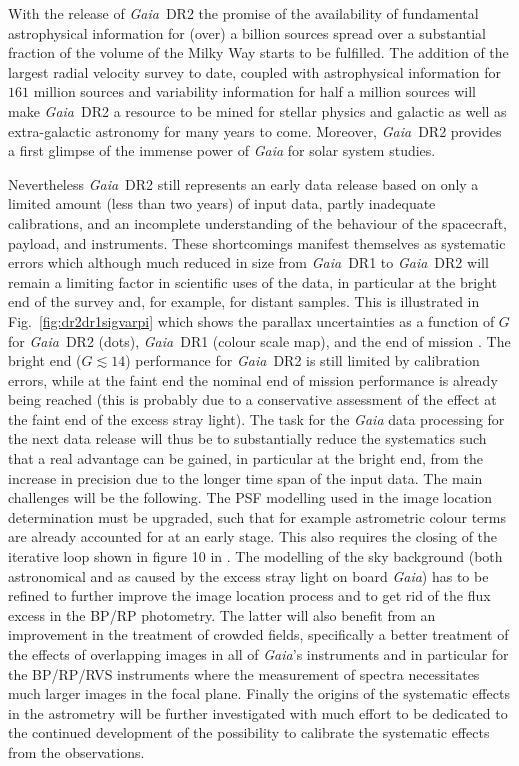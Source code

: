\documentclass[longauth]{aa_gaia} %
\newcommand\gaia{\textit{Gaia}}
\newcommand\gdr[1]{\gaia~DR#1}
\newcommand\figref[1]{Fig.~\ref{#1}}
\begin{document}
With the release of \gdr{2} the promise of the availability of fundamental astrophysical
information for (over) a billion sources spread over a substantial fraction of the volume of the
Milky Way starts to be fulfilled. The addition of the largest radial velocity survey to date,
coupled with astrophysical information for $161$ million sources and variability information for
half a million sources will make \gdr{2} a resource to be mined for stellar physics and galactic
as well as extra-galactic astronomy for many years to come. Moreover, \gdr{2} provides a first
glimpse of the immense power of {\gaia} for solar system studies.

Nevertheless \gdr{2} still represents an early data release based on only a limited amount (less
than two years) of input data, partly inadequate calibrations, and an incomplete understanding of
the behaviour of the spacecraft, payload, and instruments. These shortcomings manifest themselves as
systematic errors which although much reduced in size from \gdr{1} to \gdr{2} will remain a limiting
factor in scientific uses of the data, in particular at the bright end of the survey and, for
example, for distant samples. This is illustrated in \figref{fig:dr2dr1sigvarpi} which shows the
parallax uncertainties as a function of $G$ for \gdr{2} (dots), \gdr{1} (colour scale map), and the
end of mission \citep[solid line, as predicted after {\gaia} commissioning,][]{2016A&A...595A...1G}.
The bright end ($G\lesssim14$) performance for \gdr{2} is still limited by calibration errors, while
at the faint end the nominal end of mission performance is already being reached (this is probably
due to a conservative assessment of the effect at the faint end of the excess stray light). The task
for the {\gaia} data processing for the next data release will thus be to substantially reduce the
systematics such that a real advantage can be gained, in particular at the bright end, from the
increase in precision due to the longer time span of the input data. The main challenges will be the
following. The PSF modelling used in the image location determination must be upgraded, such that
for example astrometric colour terms are already accounted for at an early stage. This also requires
the closing of the iterative loop shown in figure 10 in \cite{2016A&A...595A...2G}. The modelling of
the sky background (both astronomical and as caused by the excess stray light on board {\gaia}) has
to be refined to further improve the image location process and to get rid of the flux excess in the
BP/RP photometry. The latter will also benefit from an improvement in the treatment of crowded
fields, specifically a better treatment of the effects of overlapping images in all of {\gaia}'s
instruments and in particular for the BP/RP/RVS instruments where the measurement of spectra
necessitates much larger images in the focal plane.  Finally the origins of the systematic effects
in the astrometry will be further investigated with much effort to be dedicated to the continued
development of the possibility to calibrate the systematic effects from the observations.
\end{document}

